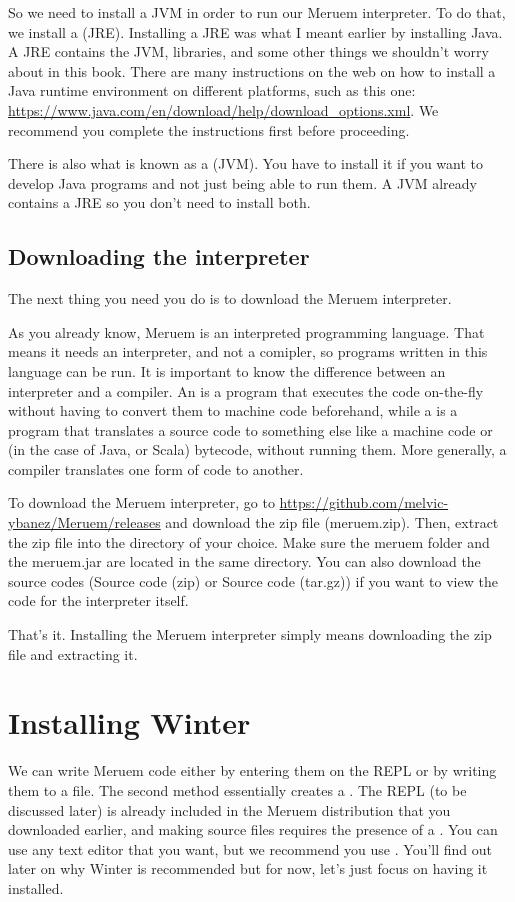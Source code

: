So we need to install a JVM in order to run our Meruem interpreter. To do that, we install a  (JRE). Installing a JRE was what I meant earlier by installing Java. A JRE contains the JVM, libraries, and some other things we shouldn't worry about in this book. There are many instructions on the web on how to install a Java runtime environment on different platforms, such as this one: \url{ https://www.java.com/en/download/help/download_options.xml}. We recommend you complete the instructions first before proceeding.

\begin{noteparagraph}
	There is also what is known as a  (JVM). You have to 	 
	install it if you want to develop Java programs and not just being able to run them. A JVM 
	already contains a JRE so you don't need to install both.
\end{noteparagraph}

\subsection{Downloading the interpreter}
The next thing you need you do is to download the Meruem interpreter. 

As you already know, Meruem is an interpreted programming language. That means it needs an interpreter, and not a comipler, so programs written in this language can be run. It is important to know the difference between an interpreter and a compiler. An  is a program that executes the code on-the-fly without having to convert them to machine code beforehand, while a  is a program that translates a source code to something else like a machine code or (in the case of Java, or Scala) bytecode, without running them. More generally, a compiler translates one form of code to another.

To download the Meruem interpreter, go to \url{https://github.com/melvic-ybanez/Meruem/releases} and download the zip file (meruem.zip). Then, extract the zip file into the directory of your choice. Make sure the meruem folder and the meruem.jar are located in the same directory. You can also download the source codes (Source code (zip) or Source code (tar.gz)) if you want to view the code for the interpreter itself. 

That's it. Installing the Meruem interpreter simply means downloading the zip file and extracting it. 

\section{Installing Winter}
We can write Meruem code either by entering them on the REPL or by writing them to a file. The second method essentially creates a . The REPL (to be discussed later) is already included in the Meruem distribution that you downloaded earlier, and making source files requires the presence of a . You can use any text editor that you want, but we recommend you use . You'll find out later on why Winter is recommended but for now, let's just focus on having it installed.

